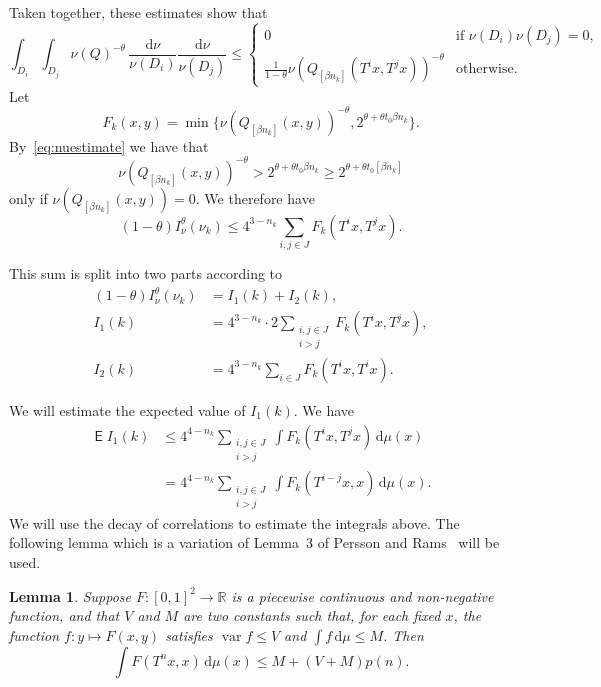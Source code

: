 \documentclass[10pt]{amsart}
\newtheorem{lemm}[theo]{Lemma}\newtheorem{prop}[theo]{Proposition}\newtheorem{coro}[theo]{Corollary}\newtheorem{conj}[theo]{Conjecture}
\theoremstyle{definition}\newtheorem{defi}[theo]{Definition}\newtheorem{rema}[theo]{Remark}\newtheorem{exam}[theo]{Example}\newtheorem{exem}[theo]{Example}\newtheorem{nota}[theo]{Notation}
\DeclareMathOperator{\E}{\mathsf{E}}
\DeclareMathOperator{\var}{var}
\newcommand*{\dd}{\mathrm{d}}
\begin{document}
Taken together, these estimates show that
\[
\int_{D_i} \int_{D_j} \nu (Q)^{-\theta} \, \frac{\dd \nu}{\nu (D_i)} \frac{\dd \nu}{\nu (D_j)} \leq
\left\{
\begin{array}{ll} 0 & \text{if } \nu (D_i) \nu (D_j) = 0,
\\ \frac{1}{1-\theta} \nu (Q_{[\beta n_k]} (T^i x, T^j x))^{-\theta} & \text{otherwise}.
\end{array} \right.
\]
Let
\[
F_k (x,y) = \min\{\nu (Q_{[\beta n_k]} (x, y))^{-\theta}, 2^{\theta + \theta t_0 \beta n_k} \}.
\]
By~\eqref{eq:nuestimate} we have that
\[
\nu (Q_{[\beta n_k]} (x, y))^{-\theta} > 2^{\theta + \theta t_0 \beta n_k} \geq 2^{\theta + \theta t_0 [\beta n_k]}
\]
only if $\nu (Q_{[\beta n_k]} (x, y)) = 0$. We therefore have
\[
(1- \theta) I_\nu^\theta (\nu_k) \leq 4^{3-n_k} \sum_{i,j \in J} F_k (T^i x, T^j x).
\]

This sum is split into two parts according to
\begin{align*}
(1 - \theta) I_\nu^\theta (\nu_k) &= I_1 (k) + I_2 (k), \\ I_1 (k) &= 4^{3 - n_k} \cdot 2 \sum_{\substack{i,j \in J \\i>j}} F_k (T^i x, T^j x),
\\ I_2 (k) &= 4^{3 - n_k} \sum_{i \in J} F_k (T^i x, T^i x).
\end{align*}

We will estimate the expected value of $I_1 (k)$. We have
\begin{align*}
\E I_1 (k) & \leq 4^{4-n_k} \sum_{\substack{i,j \in J \\i>j}} \int F_k (T^i x, T^j x) \, \dd \mu (x) \\ &= 4^{4-n_k}
\sum_{\substack{i,j \in J \\ i>j}} \int F_k (T^{i-j} x, x) \,
\dd \mu (x).
\end{align*}
We will use the decay of correlations to estimate the integrals above. The following lemma which is a variation of Lemma~3 of Persson and Rams~\cite{perssonrams} will be used.

\begin{lemm}\label{lem:perssonrams}
Suppose $F \colon [0,1]^2 \to \mathbb{R}$ is a piecewise continuous and non-negative function, and that $V$ and $M$ are two constants such that, for each fixed $x$, the function $f \colon y \mapsto F(x,y)$ satisfies $\var f \leq V$ and $\int f \, \dd\mu \leq M$. Then
\[
\int F(T^n x, x) \, \dd\mu (x) \leq M + (V + M) p (n).
\]
\end{lemm}
\end{document}

